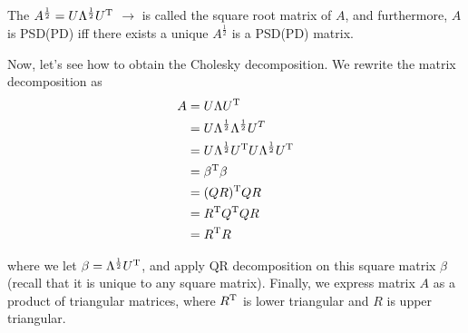 The $A^{\frac{1}{2}} = U\Lambda^{\frac{1}{2}}U^{{\rm T}}$ $\rightarrow$ is called the square root matrix of $A$, and furthermore, $A$ is PSD(PD) iff there exists a unique $A^{\frac{1}{2}}$ is a PSD(PD) matrix.

Now, let's see how to obtain the Cholesky decomposition. We rewrite the matrix decomposition as
\begin{align*}
A &= U\Lambda U^{{\rm T}} \\
&=U\Lambda^{\frac{1}{2}}\Lambda^{\frac{1}{2}}U^{T}\\
&= U\Lambda^{\frac{1}{2}}U^{{\rm T}}U\Lambda^{\frac{1}{2}}U^{{\rm T}}\\
&=\beta^{{\rm T}}\beta\\
&=(QR)^{{\rm T}}QR\\
&=R^{{\rm T}}Q^{{\rm T}}QR\\
&=R^{{\rm T}}R
\end{align*}

where we let $\beta=\Lambda^{\frac{1}{2}}U^{{\rm T}}$, and apply QR decomposition on this square matrix $\beta$(recall that it is unique to any square matrix). Finally, we express matrix $A$ as a product of triangular matrices, where $R^{{\rm T}}$ is lower triangular and $R$ is upper triangular.



